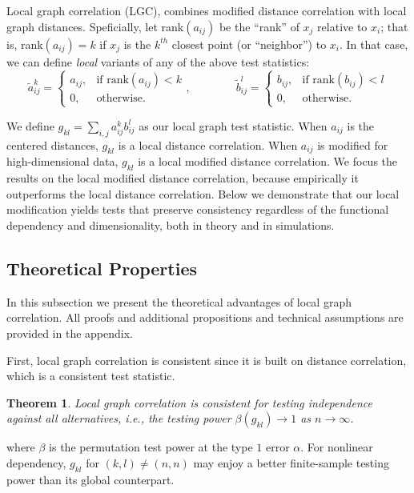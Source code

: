 \documentclass[11pt]{article}
\providecommand{\mt}[1]{\widetilde{#1}}
\newtheorem{thm}{Theorem}
\begin{document}
 Local graph correlation (LGC), combines modified distance correlation with local graph distances.  Speficially, let rank$(a_{ij})$  be the ``rank'' of $x_j$ relative to $x_i$; that is, rank$(a_{ij})=k$ if $x_j$ is the $k^{th}$ closest point (or ``neighbor'') to $x_i$.  In that case, we can define \emph{local} variants of any of the above test statistics:
\begin{equation}
    \mt{a}_{ij}^k=
    \begin{cases}
      a_{ij}, & \text{if rank}(a_{ij}) < k \\
      0, & \text{otherwise}.
    \end{cases}, \qquad \qquad
    \mt{b}_{ij}^l=
    \begin{cases}
      b_{ij}, & \text{if rank}(b_{ij}) < l \\
      0, & \text{otherwise}.
    \end{cases}
\end{equation}

We define $g_{kl}=\sum_{i,j} a_{ij}^k b_{ij}^l$ as our local graph test statistic.  When $a_{ij}$ is the centered distances, $g_{kl}$ is a local  distance correlation.  When $a_{ij}$ is modified for high-dimensional data, $g_{kl}$ is a local modified distance correlation.  We focus the results on the local modified distance correlation, because empirically it outperforms the local distance correlation.  Below we demonstrate that our local modification yields tests that preserve consistency regardless of the functional dependency and dimensionality, both in theory and in simulations.






\subsection{Theoretical Properties}
\label{main4}
In this subsection we present the theoretical advantages of local graph correlation. All proofs and additional propositions and technical assumptions are provided in the appendix. 

First, local graph correlation is consistent since it is built on distance correlation, which is a consistent test statistic. 
\begin{thm}
\label{thm1}
Local graph correlation is consistent for testing independence against all alternatives, i.e., the testing power $\beta(g_{kl}) \rightarrow 1$ as $n \rightarrow \infty$. 
\end{thm}
where $\beta$ is the permutation test power at the type $1$ error $\alpha$.
For nonlinear dependency, $g_{kl}$ for $(k,l) \neq (n,n)$ may enjoy a better finite-sample testing power than its global counterpart. 
\end{document}
